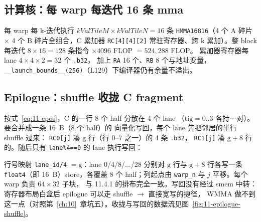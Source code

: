 \subsection{计算核：每 warp 每迭代 16 条 mma}



每 warp 每 k-迭代执行 $kValTileM \times kValTileN = 16$ 条
\texttt{HMMA16816}（4 个 A 碎片 $\times$ 4 个 B 碎片全组合，C 累加器
\texttt{RC[4][4][2]} 常驻寄存器、跨 k 累加）。整 block 每迭代
$8\times16 = 128$ 条指令 $\times 4096$ FLOP $= 524{,}288$ FLOP。
累加器寄存器每 lane $4\times4\times2 = 32$ 个 \texttt{.b32}，
加上 \texttt{RA} 16 个、\texttt{RB} 8 个与地址变量，
\texttt{\_\allowbreak{}\_\allowbreak{}launch\_\allowbreak{}bounds\_\allowbreak{}\_\allowbreak{}(256)}（L129）下编译器仍有余量不溢出。

\subsection{Epilogue：shuffle 收拢 C fragment}



按式~\ref{eq:11-cpos}，C 的一行 8 个 half 分散在 4 个 lane
（$\mathrm{tig}=0..3$ 各持一对）。要合并成一条 16~B（8 个 half）的
向量化写回，每个 lane 先把邻居的半行 shuffle 过来：
\texttt{RC0[j]} 凑 $\mathrm{g}$ 行（行 0--7 之一）的 4 条 \texttt{.b32}，
\texttt{RC1[j]} 凑 $\mathrm{g}{+}8$ 行的。随后只有
\texttt{lane\%4==0} 的 lane 执行写回：



行号映射 \texttt{lane\_id/4} $= \mathrm{g}$：lane 0/4/8/.../28 分别对
$\mathrm{g}$ 行与 $\mathrm{g}{+}8$ 行各写一条
\texttt{float4}（即 16~B）store，各覆盖 8 个 half；列起点由
\texttt{warp\_n} 与 $j$ 平移。每个 warp 负责 $64\times32$ 子块，
与 11.4.1 的排布完全一致。写回没有经过 smem 中转：
寄存器布局白盒后 epilogue 可以走 shuffle $\to$ 直接宽写的捷径，
WMMA 做不到这一点（对照第~\ref{ch:10}~章坑五）。收拢与写回的数据流见图~\ref{fig:11-epilogue-shuffle}。

